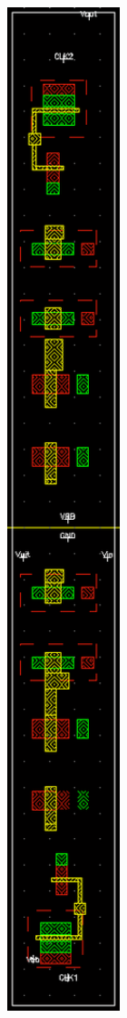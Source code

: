 \documentclass[11pt,a4paper,oneside,dutch]{article}
\begin{document}
\begin{figure}[htp]
	\centering
	\begin{subfigure}[b]{0.25\textwidth}
		\centering
		\includegraphics[width=0.5\textwidth]{elementary_frontend.png}

\end{subfigure}
\end{figure}
\end{document}
